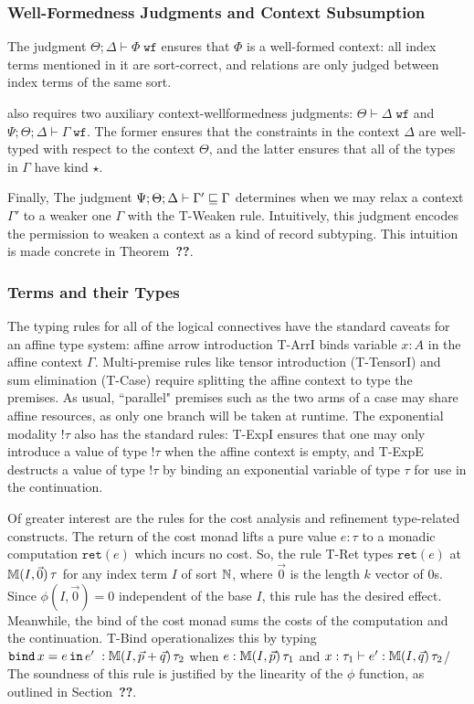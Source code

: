 \subsubsection{Well-Formedness Judgments and Context Subsumption}
The judgment $\Theta ; \Delta \vdash \Phi \; \texttt{wf}$ ensures that $\Phi$ is a well-formed context: all index terms mentioned in it are sort-correct, and relations are only judged between index terms of the same sort.

\dlambdaamor also requires two auxiliary context-wellformedness judgments: $\Theta \vdash \Delta \; \texttt{wf}$ and $\Psi ; \Theta ; \Delta \vdash \Gamma \; \texttt{wf}$. The former ensures that the constraints in the context $\Delta$ are well-typed with respect to the context $\Theta$, and the latter ensures that all of the types in $\Gamma$ have kind $\star$.

Finally, The judgment $\Psi ; \Theta ; \Delta \vdash \Gamma' \sqsubseteq \Gamma$ determines when we may relax a context $\Gamma'$ to a weaker one $\Gamma$ with the T-Weaken rule. Intuitively, this judgment encodes the permission to weaken a context as a kind of record subtyping. This intuition is made concrete in Theorem~\textbf{??}.

\subsubsection{Terms and their Types}
The typing rules for all of the logical connectives have the standard caveats for an affine type system: affine arrow introduction T-ArrI binds variable $x : A$ in the affine context $\Gamma$. Multi-premise rules like tensor introduction (T-TensorI) and sum elimination (T-Case) require splitting the affine context to type the premises. As usual, ``parallel" premises such as the two arms of a case may share affine resources, as only one branch will be taken at runtime. The exponential modality $!\tau$ also has the standard rules: T-ExpI ensures that one may only introduce a value of type $!\tau$ when the affine context is empty, and T-ExpE destructs a value of type $!\tau$ by binding an exponential variable of type $\tau$ for use in the continuation.

Of greater interest are the rules for the cost analysis and refinement type-related constructs. The return of the cost monad lifts a pure value $e : \tau$ to a monadic computation $\texttt{ret}(e)$ which incurs no cost. So, the rule T-Ret types $\texttt{ret}(e)$ at $\mathbb{M}(I,\vec{0}) \, \tau$ for any index term $I$ of sort $\mathbb{N}$, where $\vec{0}$ is the length $k$ vector of $0$s. Since $\phi(I,\vec{0}) = 0$ independent of the base $I$, this rule has the desired effect. Meanwhile, the bind of the cost monad sums the costs of the computation and the continuation. T-Bind operationalizes this by typing $\texttt{bind}\, x = e \, \texttt{in} \, e' \; : \mathbb{M}(I,\vec{p} + \vec{q}) \, \tau_2$ when $e : \mathbb{M}(I,\vec{p}) \, \tau_1$ and $x : \tau_1 \vdash e' : \mathbb{M}(I,\vec{q}) \, \tau_2$/ The soundness of this rule is justified by the linearity of the $\phi$ function, as outlined in Section~\textbf{??}.

